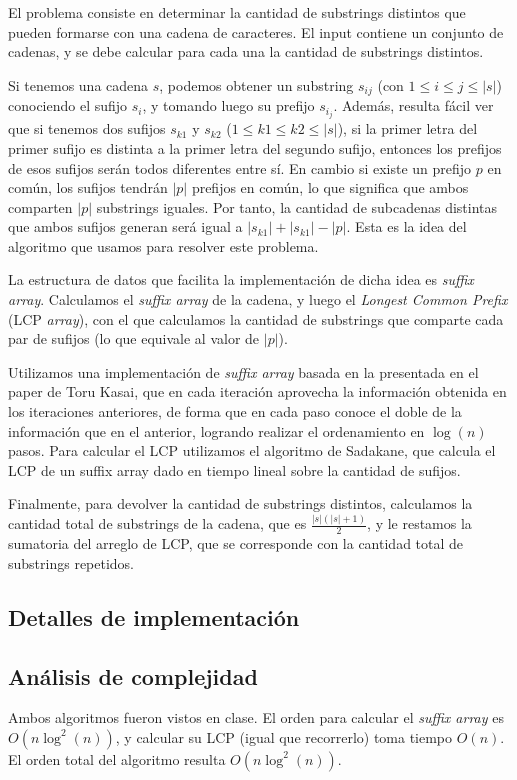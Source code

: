 El problema consiste en determinar la cantidad de substrings distintos que
pueden formarse con una cadena de caracteres. El input contiene un conjunto de
cadenas, y se debe calcular para cada una la cantidad de substrings distintos.

Si tenemos una cadena $s$, podemos obtener un substring $s_{ij}$ (con $1
\le i \le j \le |s|$) conociendo el sufijo $s_i$, y tomando luego su prefijo
$s_{i_j}$. Además, resulta fácil ver que si tenemos dos sufijos $s_{k1}$ y
$s_{k2}$ ($1 \le k1 \le k2 \le |s|$), si la primer letra del primer sufijo es
distinta a la primer letra del segundo sufijo, entonces los prefijos de esos
sufijos serán todos diferentes entre sí. En cambio si existe un prefijo $p$
en común, los sufijos tendrán $|p|$ prefijos en común, lo que significa
que ambos comparten $|p|$ substrings iguales. Por tanto, la cantidad de
subcadenas distintas que ambos sufijos generan será igual a $|s_{k1}| + |s_{k1}|
-|p|$. Esta es la idea del algoritmo que usamos para resolver este problema.

La estructura de datos que facilita la implementación de dicha idea es {\sl
suffix array}. Calculamos el {\sl suffix array} de la cadena, y luego el {\sl
Longest Common Prefix} (LCP {\sl array}), con el que calculamos la cantidad de
substrings que comparte cada par de sufijos (lo que equivale al valor de $|p|$).

Utilizamos una implementación de {\sl suffix array} basada en la presentada
en el paper de Toru Kasai\cite{kasai}, que en cada iteración aprovecha la
información obtenida en los iteraciones anteriores, de forma que en cada
paso conoce el doble de la información que en el anterior, logrando realizar
el ordenamiento en $\log(n)$ pasos. Para calcular el LCP utilizamos el
algoritmo de Sadakane, que calcula el LCP de un suffix array dado en tiempo
lineal sobre la cantidad de sufijos\cite{sadakane}.

Finalmente, para devolver la cantidad de substrings distintos,
calculamos la cantidad total de substrings de la cadena, que es
$\displaystyle\frac{|s|(|s|+1)}{2}$, y le restamos la sumatoria del arreglo
de LCP, que se corresponde con la cantidad total de substrings repetidos.

\subsection*{Detalles de implementación}

\subsection*{Análisis de complejidad}

Ambos algoritmos fueron vistos en clase. El orden para calcular el {\sl
suffix array} es $O(n\log^2(n))$, y calcular su LCP (igual que recorrerlo)
toma tiempo $O(n)$. El orden total del algoritmo resulta $O(n\log^2(n))$.
